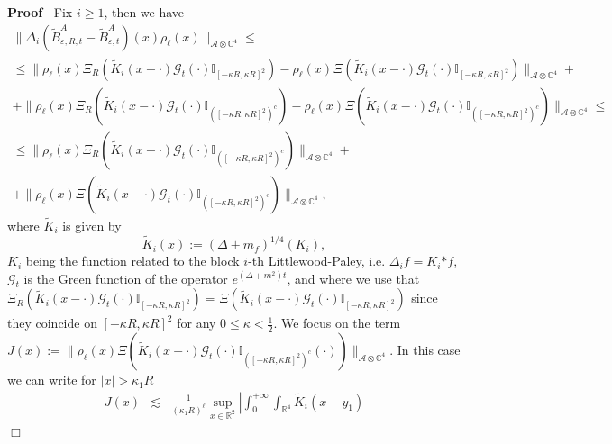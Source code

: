 \documentclass{article}
\newcommand{\assign}{:=}
\newcommand{\asterisk}{\mathord{*}}
\newenvironment{proof}{\noindent\textbf{Proof\ }}{\hspace*{\fill}$\Box$\medskip}
\begin{document}
\begin{proof}
  Fix $i \geqslant 1$, then we have
  \begin{equation}
    \begin{array}{c}
      \| \Delta_i (\tilde{B}^A_{\varepsilon, R, t} - \tilde{B}^A_{\varepsilon,
      t}) (x) \rho_{\ell} (x) \|_{\mathcal{A} \otimes \mathbb{C}^4}
      \leqslant\\
      \leqslant \| \rho_{\ell} (x) \Xi_R (\tilde{K}_i (x - \cdot)
      \mathcal{G}_t (\cdot) \mathbb{I}_{[- \kappa R, \kappa R]^2}) -
      \rho_{\ell} (x)_{} \Xi (\tilde{K}_i (x - \cdot) \mathcal{G}_t (\cdot)
      \mathbb{I}_{[- \kappa R, \kappa R]^2}) \|_{\mathcal{A} \otimes
      \mathbb{C}^4} +\\
      + \| \rho_{\ell} (x) \Xi_R (\tilde{K}_i (x - \cdot) \mathcal{G}_t
      (\cdot) \mathbb{I}_{([- \kappa R, \kappa R]^2)^c}) - \rho_{\ell} (x)_{}
      \Xi (\tilde{K}_i (x - \cdot) \mathcal{G}_t (\cdot) \mathbb{I}_{([-
      \kappa R, \kappa R]^2)^c}) \|_{\mathcal{A} \otimes \mathbb{C}^4}
      \leqslant\\
      \leqslant \| \rho_{\ell} (x) \Xi_R (\tilde{K}_i (x - \cdot)
      \mathcal{G}_t (\cdot) \mathbb{I}_{([- \kappa R, \kappa R]^2)^c})
      \|_{\mathcal{A} \otimes \mathbb{C}^4} +\\
      + \| \rho_{\ell} (x) \Xi (\tilde{K}_i (x - \cdot) \mathcal{G}_t (\cdot)
      \mathbb{I}_{([- \kappa R, \kappa R]^2)^c}) \|_{\mathcal{A} \otimes
      \mathbb{C}^4},
    \end{array}
  \end{equation}
  where $\tilde{K}_i$ is given by
  \[ \tilde{K}_i (x) \assign (\Delta + m_f)^{1 / 4} (K_i), \]
  $K_i$ being the function related to the block $i$-th Littlewood-Paley, i.e.
  $\Delta_i f = K_i \asterisk f$, $\mathcal{G}_t$ is the Green function of the
  operator $e^{(\Delta + m^2) t}$, and where we use that $\Xi_R (\tilde{K}_i
  (x - \cdot) \mathcal{G}_t (\cdot) \mathbb{I}_{[- \kappa R, \kappa R]^2})
  =_{} \Xi (\tilde{K}_i (x - \cdot) \mathcal{G}_t (\cdot) \mathbb{I}_{[-
  \kappa R, \kappa R]^2})_{}$ since they coincide on $[- \kappa R, \kappa
  R]^2$ for any $0 \leqslant \kappa < \frac{1}{2}$. We focus on the term $J
  (x) \assign \| \rho_{\ell} (x) \Xi (\tilde{K}_i (x - \cdot) \mathcal{G}_t
  (\cdot) \mathbb{I}_{([- \kappa R, \kappa R]^2)^c} (\cdot)) \|_{\mathcal{A}
  \otimes \mathbb{C}^4}$. In this case we can write for $| x | > \kappa_1 R$
  \begin{eqnarray}
    J (x) & \lesssim & \frac{1}{(\kappa_1 R)^{\ell}} \sup_{x \in \mathbb{R}^2}
    \left. \left| \int_0^{+ \infty} \int_{\mathbb{R}^4} \tilde{K}_i (x - y_1)

\end{eqnarray}
\end{proof}
\end{document}
